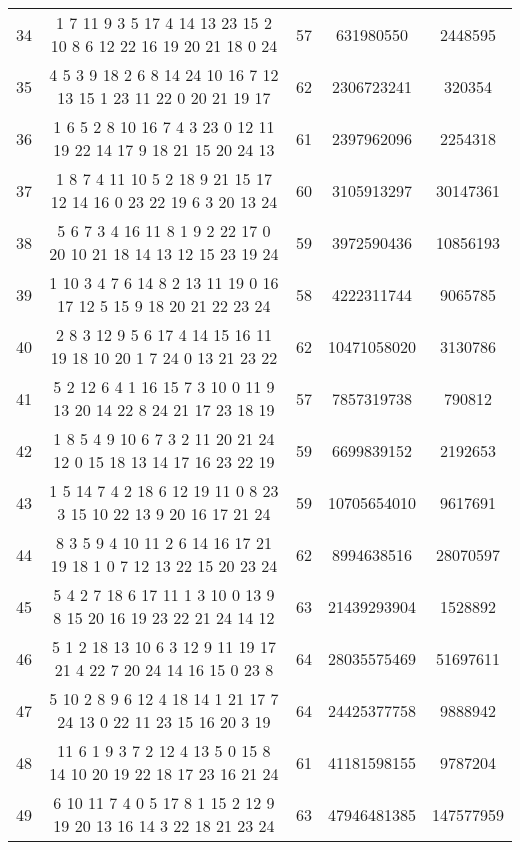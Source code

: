 \documentclass[a4paper,11pt,oneside,openany]{jsbook}
\begin{document}
\begin{table}[]
{\begin{tabular}{|c|c|c|c|c|}
34 & 1 7 11 9 3 5 17 4 14 13 23 15 2 10 8 6 12 22 16 19 20 21 18 0 24  & 57 & 631980550 & 2448595 \\
35 & 4 5 3 9 18 2 6 8 14 24 10 16 7 12 13 15 1 23 11 22 0 20 21 19 17  & 62 & 2306723241 & 320354 \\
36 & 1 6 5 2 8 10 16 7 4 3 23 0 12 11 19 22 14 17 9 18 21 15 20 24 13  & 61 & 2397962096 & 2254318 \\
37 & 1 8 7 4 11 10 5 2 18 9 21 15 17 12 14 16 0 23 22 19 6 3 20 13 24  & 60 & 3105913297 & 30147361 \\
38 & 5 6 7 3 4 16 11 8 1 9 2 22 17 0 20 10 21 18 14 13 12 15 23 19 24  & 59 & 3972590436 & 10856193 \\
39 & 1 10 3 4 7 6 14 8 2 13 11 19 0 16 17 12 5 15 9 18 20 21 22 23 24  & 58 & 4222311744 & 9065785 \\
40 & 2 8 3 12 9 5 6 17 4 14 15 16 11 19 18 10 20 1 7 24 0 13 21 23 22  & 62 & 10471058020 & 3130786 \\
41 & 5 2 12 6 4 1 16 15 7 3 10 0 11 9 13 20 14 22 8 24 21 17 23 18 19  & 57 & 7857319738 & 790812 \\
42 & 1 8 5 4 9 10 6 7 3 2 11 20 21 24 12 0 15 18 13 14 17 16 23 22 19  & 59 & 6699839152 & 2192653 \\
43 & 1 5 14 7 4 2 18 6 12 19 11 0 8 23 3 15 10 22 13 9 20 16 17 21 24  & 59 & 10705654010 & 9617691 \\
44 & 8 3 5 9 4 10 11 2 6 14 16 17 21 19 18 1 0 7 12 13 22 15 20 23 24  & 62 & 8994638516 & 28070597 \\
45 & 5 4 2 7 18 6 17 11 1 3 10 0 13 9 8 15 20 16 19 23 22 21 24 14 12  & 63 & 21439293904 & 1528892 \\
46 & 5 1 2 18 13 10 6 3 12 9 11 19 17 21 4 22 7 20 24 14 16 15 0 23 8  & 64 & 28035575469 & 51697611 \\
47 & 5 10 2 8 9 6 12 4 18 14 1 21 17 7 24 13 0 22 11 23 15 16 20 3 19  & 64 & 24425377758 & 9888942 \\
48 & 11 6 1 9 3 7 2 12 4 13 5 0 15 8 14 10 20 19 22 18 17 23 16 21 24  & 61 & 41181598155 & 9787204 \\
49 & 6 10 11 7 4 0 5 17 8 1 15 2 12 9 19 20 13 16 14 3 22 18 21 23 24  & 63 & 47946481385 & 147577959 \\ \hline
\end{tabular}
}
\end{table}
\end{document}
